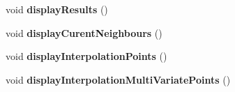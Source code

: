 \begin{DoxyCompactItemize}
\item 
void {\bfseries display\+Results} ()\hypertarget{class_interpolation_a01e1a617a1d21ecf0372ba7c9852fa89}{}\label{class_interpolation_a01e1a617a1d21ecf0372ba7c9852fa89}

\item 
void {\bfseries display\+Curent\+Neighbours} ()\hypertarget{class_interpolation_a562465d2e306595bbf450b3aa9108a2a}{}\label{class_interpolation_a562465d2e306595bbf450b3aa9108a2a}

\item 
void {\bfseries display\+Interpolation\+Points} ()\hypertarget{class_interpolation_a34130fd5f41a52fd9afb6443f1632955}{}\label{class_interpolation_a34130fd5f41a52fd9afb6443f1632955}

\item 
void {\bfseries display\+Interpolation\+Multi\+Variate\+Points} ()\hypertarget{class_interpolation_af40d25297c4e01edbabf7c3f4ce7bd64}{}\label{class_interpolation_af40d25297c4e01edbabf7c3f4ce7bd64}

\end{DoxyCompactItemize}
